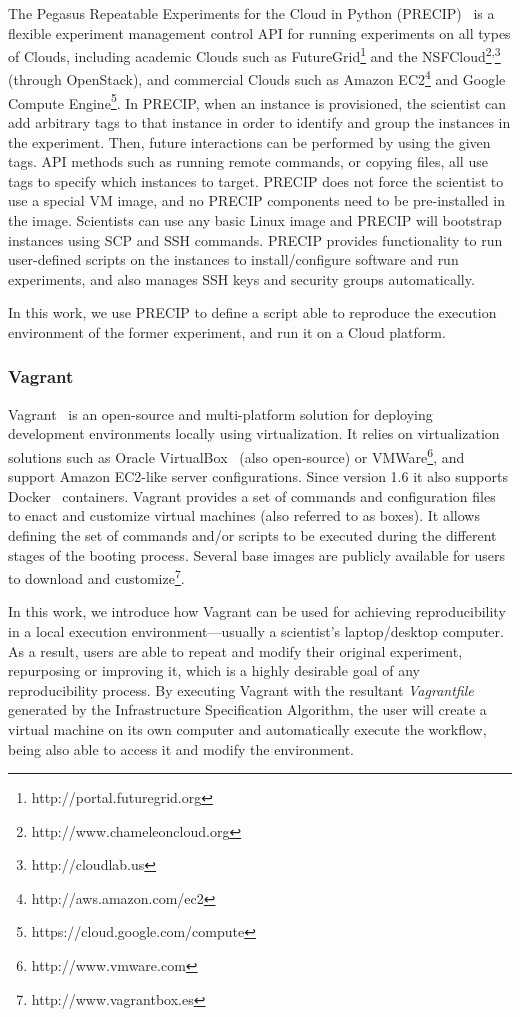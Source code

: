The Pegasus Repeatable Experiments for the Cloud in Python 
(PRECIP)~\cite{Azarnoosh-CRC-2013} is a flexible experiment 
management control API for running experiments on all types of 
Clouds, including academic Clouds such as FutureGrid\footnote{http://portal.futuregrid.org} 
and the NSFCloud\footnote{http://www.chameleoncloud.org}\textsuperscript{,}\footnote{http://cloudlab.us}
(through OpenStack), and commercial Clouds such as Amazon 
EC2\footnote{http://aws.amazon.com/ec2} and Google Compute 
Engine\footnote{https://cloud.google.com/compute}. In PRECIP, 
when an instance is provisioned, the scientist can add arbitrary 
tags to that instance in order to identify and group the instances 
in the experiment. Then, future interactions can be performed by 
using the given tags. API methods such as running remote commands, 
or copying files, all use tags to specify which instances to target. 
PRECIP does not force the scientist to use a special VM image, 
and no PRECIP components need to be pre-installed in the image. 
Scientists can use any basic Linux image and PRECIP will bootstrap 
instances using SCP and SSH commands. PRECIP provides 
functionality to run user-defined scripts on the instances to install/configure 
software and run experiments, and also manages SSH keys and 
security groups automatically.

In this work, we use PRECIP to define a script able to reproduce 
the execution environment of the former experiment, and run it on 
a Cloud platform.


\subsubsection{Vagrant}

Vagrant~\cite{palat2012introducing} is an open-source and multi-platform solution for deploying 
development environments locally using virtualization. It relies on virtualization solutions such as 
Oracle VirtualBox~\cite{Watson2008} (also open-source) or  VMWare\footnote{http://www.vmware.com}, and support 
Amazon EC2-like server configurations. Since version 1.6 it also supports Docker~\cite{Merkel2014} 
containers.
Vagrant provides a set of commands and configuration files to enact and customize virtual machines
(also referred to as boxes). It allows defining the set of commands and/or scripts to be executed during 
the different stages of the booting process. Several base images are publicly available for users to 
download and customize\footnote{http://www.vagrantbox.es}. 
 
In this work, we introduce how Vagrant can be used for achieving reproducibility in a local execution
environment---usually a scientist's laptop/desktop computer. As a result, users are able to repeat and 
modify their original experiment, repurposing or improving it, which is a highly desirable goal of any 
reproducibility process. By executing Vagrant with the resultant {\it Vagrantfile} generated by the Infrastructure Specification Algorithm, 
the user will create a virtual machine on its own computer and automatically execute the workflow, 
being also able to access it and modify the environment.




